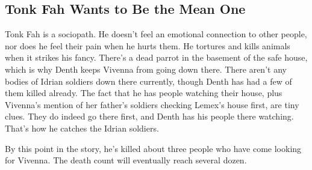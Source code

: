 \subsection*{Tonk Fah Wants to Be the Mean One}

Tonk Fah is a sociopath. He doesn’t feel an emotional connection to other people, nor does he feel their pain when he hurts them. He tortures and kills animals when it strikes his fancy. There’s a dead parrot in the basement of the safe house, which is why Denth keeps Vivenna from going down there. There aren’t any bodies of Idrian soldiers down there currently, though Denth has had a few of them killed already. The fact that he has people watching their house, plus Vivenna’s mention of her father’s soldiers checking Lemex’s house first, are tiny clues. They do indeed go there first, and Denth has his people there watching. That’s how he catches the Idrian soldiers.

By this point in the story, he’s killed about three people who have come looking for Vivenna. The death count will eventually reach several dozen.




